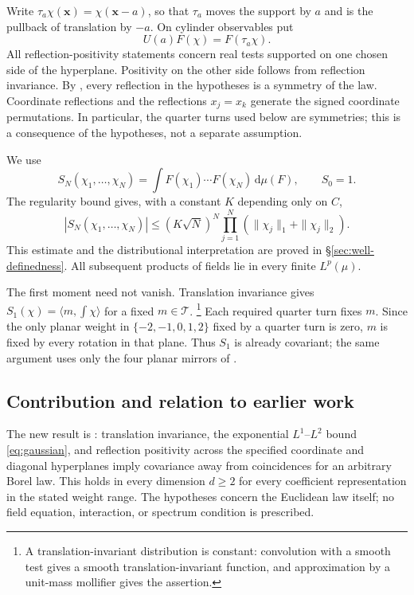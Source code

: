 \documentclass[11pt, letterpaper, reqno]{amsart}
\theoremstyle{definition}
\theoremstyle{remark}
\newcommand{\calT}{\mathcal{T}}
\newcommand{\bfx}{\mathbf{x}}
\newcommand{\dd}{\,\mathrm{d}}
\begin{document}
Write $\tau_a\chi(\bfx)=\chi(\bfx-a)$, so that $\tau_a$ moves
the support by $a$ and is the pullback of translation by $-a$.
On cylinder observables put
\begin{equation}\label{eq:U}
 U(a)F(\chi)=F(\tau_a\chi).
\end{equation}
All reflection-positivity statements concern real tests supported on
one chosen side of the hyperplane. Positivity on the other side follows
from reflection invariance. By , every reflection in
the hypotheses is a symmetry of the law. Coordinate reflections and
the reflections $x_j=x_k$ generate the signed coordinate permutations.
In particular, the quarter turns used below are symmetries; this is
a consequence of the hypotheses, not a separate assumption.

We use
\begin{equation}\label{eq:moments}
 S_N(\chi_1,\dots,\chi_N)=\int F(\chi_1)\cdots F(\chi_N)\dd\mu(F),
 \qquad S_0=1.
\end{equation}
The regularity bound gives, with a constant $K$ depending only on $C$,
\begin{equation}\label{eq:moment_bd}
 |S_N(\chi_1,\dots,\chi_N)|\leq(K\sqrt N)^N
       \prod_{j=1}^N(\|\chi_j\|_1+\|\chi_j\|_2).
\end{equation}
This estimate and the distributional interpretation are proved in
\S\ref{sec:well-definedness}. All subsequent products of fields lie
in every finite $L^p(\mu)$.

The first moment need not vanish. Translation invariance gives
$S_1(\chi)=\langle m,\int\chi\rangle$ for a fixed $m\in\calT$.
\footnote{A translation-invariant distribution is constant: convolution
with a smooth test gives a smooth translation-invariant function, and
approximation by a unit-mass mollifier gives the assertion.}
Each required quarter turn fixes $m$. Since the only planar weight in
$\{-2,-1,0,1,2\}$ fixed by a quarter turn is zero, $m$ is fixed by
every rotation in that plane. Thus $S_1$ is already covariant; the
same argument uses only the four planar mirrors of .

\subsection{Contribution and relation to earlier work}

The new result is : translation invariance, the exponential
$L^1$--$L^2$ bound \eqref{eq:gaussian}, and reflection positivity across the specified coordinate
and diagonal hyperplanes imply covariance away from coincidences for
an arbitrary Borel law. This holds in every dimension $d\geq2$ for
every coefficient representation in the stated weight range. The
hypotheses concern the Euclidean law itself; no field equation,
interaction, or spectrum condition is prescribed.
\end{document}

